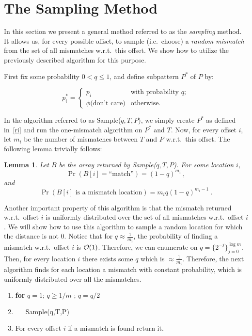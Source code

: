 \documentclass[11pt]{article}
\newcommand{\calO}{{\cal{O}}}
\newtheorem{lem}[thm]{Lemma}
\newcommand{\be}{\begin{equation}}
\newcommand{\ee}{\end{equation}}
\begin{document}
\section{The Sampling Method}\label{s:naive}
In this section we present a general method referred to as the
\emph{sampling} method. It allows us, for every possible offset,
to sample (i.e.\ choose) a {\em random mismatch} from the set of all
mismatches w.r.t.\ this offset.
We show how to utilize the previously described algorithm for this
purpose.

First fix some probability $0< q \leq 1$, and define subpattern
$P^*$ of $P$ by:

\be \label{ri}
 p^{*}_i=
 \begin{cases}
 p_i  & \mbox{with probability } q;\\
\phi \mbox{(don't care)}             & \mbox{otherwise.}
 \end{cases}
 \ee

In the algorithm referred to as Sample($q,T,P$), we simply create
$P^*$ as defined in~\eqref{ri} and run the one-mismatch algorithm on
$P^*$ and $T$. Now, for every offset $i$, let $m_i$ be the number of
mismatches between $T$ and $P$ w.r.t.\ this offset. The following
lemma trivially follows:

\begin{lem}\label{sample}
Let $B$ be the array returned by Sample($q,T,P$). For some
location $i$,
\[ \Pr(B[i]=\mbox{``match''})=(1-q)^{m_i}\ ,\]
and
\[ \Pr(\mbox{$B[i]$ is a
mismatch location})=m_iq(1-q)^{m_i-1}\ .\]
\end{lem}

Another important property of this algorithm is that the mismatch
returned w.r.t.\ offset $i$ is uniformly distributed over the set
of all mismatches w.r.t.\ offset $i$. We will show how to use this
algorithm to sample a random location for which the distance is
not $0$. Notice that for $q\approx \frac{1}{m_i}$, the probability
of finding a mismatch w.r.t.\ offset $i$ is $\calO(1)$. Therefore,
we can enumerate on $q=\{ 2^{-j} \}_{j=0}^{\log{m}}$. Then, for
every location $i$ there exists some $q$ which is
$\approx\frac{1}{m_i}$. Therefore, the next algorithm finds for
each location a mismatch with constant probability, which is
uniformly distributed over all the mismatches.
\begin{enumerate}
\item {\bf{for}} $q=1$; $q\geq 1/m$ ; $q=q/2$ \item \ \ \
Sample(q,T,P) \item For every offset $i$ if a mismatch is found
return it.
\end{enumerate}
\end{document}
